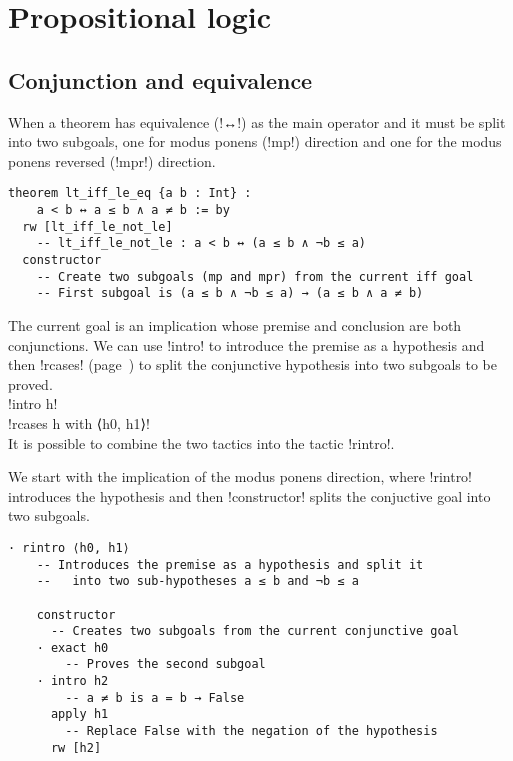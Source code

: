 
\section{Propositional logic}

\subsection{Conjunction and equivalence}

When a theorem has equivalence (!↔!) as the main operator and it must be split into two subgoals, one for modus ponens (!mp!) direction and one for the modus ponens reversed (!mpr!) direction.

\begin{Verbatim}
theorem lt_iff_le_eq {a b : Int} : 
    a < b ↔ a ≤ b ∧ a ≠ b := by
  rw [lt_iff_le_not_le]
    -- lt_iff_le_not_le : a < b ↔ (a ≤ b ∧ ¬b ≤ a)
  constructor
    -- Create two subgoals (mp and mpr) from the current iff goal
    -- First subgoal is (a ≤ b ∧ ¬b ≤ a) → (a ≤ b ∧ a ≠ b)
 \end{Verbatim}


The current goal is an implication whose premise and conclusion are both conjunctions. We can use !intro! to introduce the premise as a hypothesis and then !rcases! (page~\pageref{p.rcases}) to split the conjunctive hypothesis into two subgoals to be proved.\\
\indnt{}!intro h!\\
\indnt{}!rcases h with ⟨h0, h1⟩!\\
It is possible to combine the two tactics into the tactic !rintro!.

We start with the implication of the modus ponens direction, where !rintro! introduces the hypothesis and then !constructor! splits the conjuctive goal into two subgoals.
\begin{Verbatim}[firstnumber=last]
  · rintro ⟨h0, h1⟩
    -- Introduces the premise as a hypothesis and split it
    --   into two sub-hypotheses a ≤ b and ¬b ≤ a

    constructor
      -- Creates two subgoals from the current conjunctive goal
    · exact h0
        -- Proves the second subgoal
    · intro h2
        -- a ≠ b is a = b → False
      apply h1
        -- Replace False with the negation of the hypothesis
      rw [h2]
\end{Verbatim}

